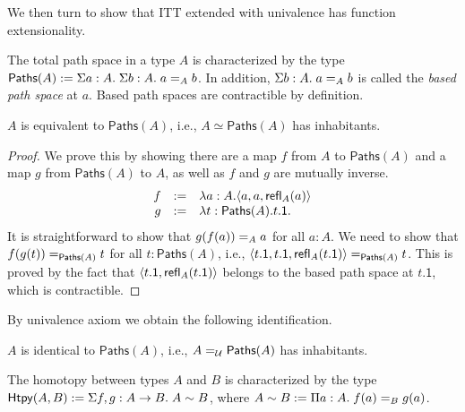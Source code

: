 \documentclass{article}
\newcommand{\calU}{\mathcal{U}}
\begin{document}
We then turn to show that ITT extended with univalence has function 
extensionality.

\begin{definition}
	The total path space in a type $A$ is characterized by the type 
	$\mathsf{Paths}(A) \eqdef 
	\hsigtype{a}{A}{\hsigtype{b}{A}{\Ideq{A}{a}{b}}}$.
	In addition, $\hsigtype{b}{A}{\Ideq{A}{a}{b}}$ is called the \emph{based 
	path space} at $a$.
	Based path spaces are contractible by definition.
\end{definition}

\begin{lemma}
	$A$ is equivalent to $\mathsf{Paths}(A)$, i.e., $A \simeq 
	\mathsf{Paths}(A)$ has inhabitants.
\end{lemma}
\begin{proof}
	We prove this by showing there are a map $f$ from $A$ to 
	$\mathsf{Paths}(A)$ and a map $g$ from $\mathsf{Paths}(A)$ to $A$, as 
	well as $f$ and $g$ are mutually inverse.
	\[
	\begin{array}{rcl}
	f & \eqdef & \lambda a :A. \langle a, a, \refl{A}{a} \rangle \\
	g & \eqdef & \lambda t : \mathsf{Paths}(A). t.\mathsf{1}.
	\end{array}
	\]
	It is straightforward to show that $\Ideq{A}{g(f(a))}{a}$ for all $a : A$.
	We need to show that $\Ideq{\mathsf{Paths}(A)}{f(g(t))}{t}$ for all $t : 
	\mathsf{Paths}(A)$, i.e., $\Ideq{\mathsf{Paths}(A)}{\langle t.\mathsf{1}, 
	t.\mathsf{1}, \refl{A}{t.\mathsf{1}} \rangle }{t}$.
	This is proved by the fact that $\langle t.\mathsf{1}, 
	\refl{A}{t.\mathsf{1}} \rangle$ belongs to the based path space at 
	$t.\mathsf{1}$, which is contractible.
\end{proof}

By univalence axiom we obtain the following identification.

\begin{corollary}
	$A$ is identical to $\mathsf{Paths}(A)$, i.e., 
	$\Ideq{\calU}{A}{\mathsf{Paths}(A)}$ has inhabitants.
\end{corollary}

\begin{definition}[Homotopies]
	The homotopy between types $A$ and $B$ is characterized by the 
	type $\mathsf{Htpy}(A,B) \eqdef \hsigtype{f,g}{A \to B}{A \sim B}$, where 
	$A \sim B \eqdef \hpitype{a}{A}{\Ideq{B}{f(a)}{g(a)}}$.
\end{definition}
\end{document}
